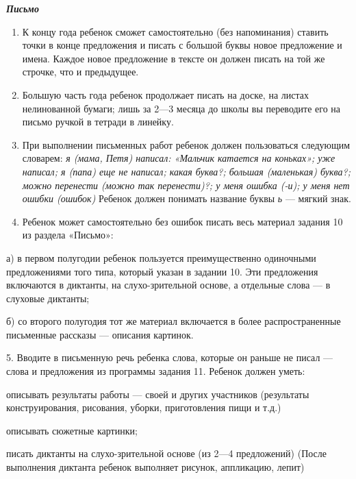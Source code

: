 \documentclass{book}
\renewcommand{\emph}[1]{\textit{#1}}
\begin{document}
\emph{\textbf{Письмо}}


\begin{enumerate}
\def\labelenumi{\arabic{enumi}.}
\item
  
  К концу года ребенок сможет самостоятельно (без напоминания) ставить
  точки в конце предложения и писать с большой буквы новое предложение и
  имена. Каждое новое предложение в тексте он должен писать на той же
  строчке, что и предыдущее.
  
\item
  
  Большую часть года ребенок продолжает писать на доске, на листах
  нелинованной бумаги; лишь за 2---3 месяца до школы вы переводите его
  на письмо ручкой в тетради в линейку.
  
\item
  
  При выполнении письменных работ ребенок должен пользоваться следующим
  словарем: \emph{я (мама, Петя) написал: «Мальчик катается на коньках»;
  уже написал; я (папа) еще не написал; какая буква?; большая
  (маленькая) буква?; можно перенести (можно так перенести)?; у меня
  ошибка (-и); у меня нет ошибки (ошибок)} Ребенок должен понимать
  название буквы \emph{ь} --- мягкий знак.
  
\item
  
  Ребенок может самостоятельно без ошибок писать весь материал задания
  10 из раздела «Письмо»:
  
\end{enumerate}


а) в первом полугодии ребенок пользуется преимущественно одиночными
предложениями того типа, который указан в задании 10. Эти предложения
включаются в диктанты, на слухо-зрительной основе, а отдельные слова ---
в слуховые диктанты;

б) со второго полугодия тот же материал включается в более
распространенные письменные рассказы --- описания картинок.

5. Вводите в письменную речь ребенка слова, которые он раньше не писал
--- слова и предложения из программы задания 11. Ребенок должен уметь:

описывать результаты работы --- своей и других участников (результаты
конструирования, рисования, уборки, приготовления пищи и т.д.)

описывать сюжетные картинки;

писать диктанты на слухо-зрительной основе (из 2---4 предложений) (После
выполнения диктанта ребенок выполняет рисунок, аппликацию, лепит)
\end{document}
